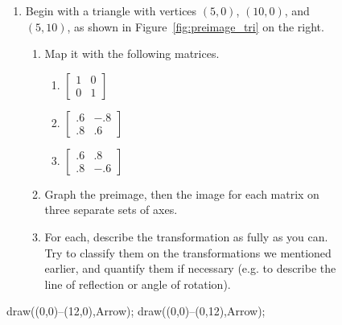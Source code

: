 \documentclass[../gatm.tex]{subfiles}
\begin{document}
\newcommand{\mtrxtbt}[4] {$\left[\begin{array}{cc}#1 & #2 \\ #3 & #4 \end{array}\right]$}

\begin{figure}[h]
	\begin{center}
		\begin{minipage}[c]{0.55\textwidth}
			\begin{enumerate}
				\setcounter{enumi}{\value{mp_problem_i}}
				\item Begin with a triangle with vertices $(5,0)$, $(10,0)$, and $(5,10)$, as shown in Figure~\ref{fig:preimage_tri} on the right.
				\begin{enumerate}
					\item Map it with the following matrices.
					\begin{multicols}{3}
						\begin{enumerate}
							\item $\left[\begin{array}{cc}1 & 0 \\ 0 & 1 \end{array}\right]$
							\item $\left[\begin{array}{cc}.6 & -.8 \\ .8 & .6 \end{array}\right]$
							\item $\left[\begin{array}{cc}.6 & .8 \\ .8 & -.6 \end{array}\right]$
						\end{enumerate}
					\end{multicols}
					\item Graph the preimage, then the image for each matrix on three separate sets of axes.
					\item For each, describe the transformation as fully as you can. Try to classify them on the transformations we mentioned earlier, and quantify them if necessary (e.g. to describe the line of reflection or angle of rotation).
				\end{enumerate}
				\setcounter{mp_problem_i}{\value{enumi}}
			\end{enumerate}
		\end{minipage}
		\hfill
		\begin{minipage}[c]{0.35\textwidth}
			\begin{center}
				\begin{minipage}[b]{\textwidth}
					\centering
					\begin{asy}[width=0.7\textwidth]
						draw((0,0)--(12,0),Arrow);
						draw((0,0)--(0,12),Arrow);
						

\end{asy}
\end{minipage}
\end{center}
\end{minipage}
\end{center}
\end{figure}
\end{document}
